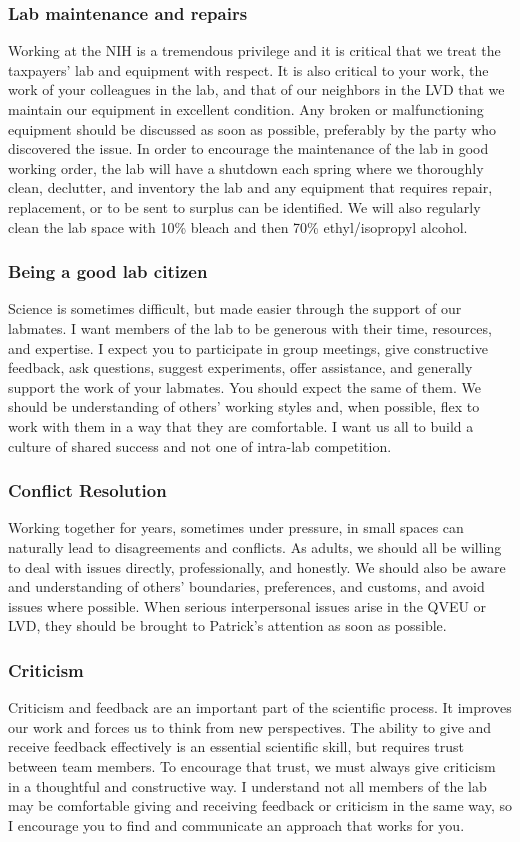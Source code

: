 \documentclass[10pt, letterpaper, twocolumn]{article} %
\begin{document}
\subsubsection{Lab maintenance and repairs}
Working at the NIH is a tremendous privilege and it is critical that we treat the taxpayers' lab and equipment with respect. It is also critical to your work, the work of your colleagues in the lab, and that of our neighbors in the LVD that we maintain our equipment in excellent condition. Any broken or malfunctioning equipment should be discussed as soon as possible, preferably by the party who discovered the issue.
In order to encourage the maintenance of the lab in good working order, the lab will have a shutdown each spring where we thoroughly clean, declutter, and inventory the lab and any equipment that requires repair, replacement, or to be sent to surplus can be identified. We will also regularly clean the lab space with 10\% bleach and then 70\% ethyl/isopropyl alcohol.

\subsubsection{Being a good lab citizen}
Science is sometimes difficult, but made easier through the support of our labmates. I want members of the lab to be generous with their time, resources, and expertise. I expect you to participate in group meetings, give constructive feedback, ask questions, suggest experiments, offer assistance, and generally support the work of your labmates. You should expect the same of them. We should be understanding of others' working styles and, when possible, flex to work with them in a way that they are comfortable. I want us all to build a culture of shared success and not one of intra-lab competition.

\subsubsection{Conflict Resolution}
Working together for years, sometimes under pressure, in small spaces can naturally lead to disagreements and conflicts. As adults, we should all be willing to deal with issues directly, professionally, and honestly. We should also be aware and understanding of others' boundaries, preferences, and customs, and avoid issues where possible. When serious interpersonal issues arise in the QVEU or LVD, they should be brought to Patrick's attention as soon as possible.

\subsubsection{Criticism}
Criticism and feedback are an important part of the scientific process. It improves our work and forces us to think from new perspectives. The ability to give and receive feedback effectively is an essential scientific skill, but requires trust between team members. To encourage that trust, we must always give criticism in a thoughtful and constructive way. I understand not all members of the lab may be comfortable giving and receiving feedback or criticism in the same way, so I encourage you to find and communicate an approach that works for you.
\end{document}
